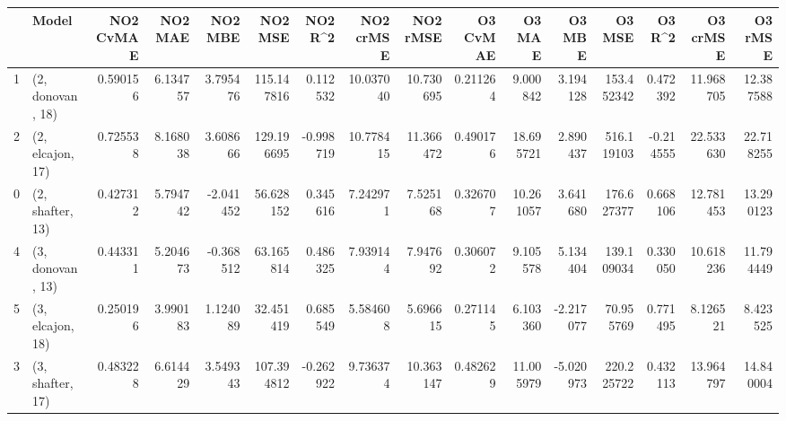 \begin{tabular}{llrrrrrrrrrrrrrr}
\toprule
{} &             Model &  NO2 CvMAE &   NO2 MAE &   NO2 MBE &     NO2 MSE &   NO2 R\textasciicircum2 &  NO2 crMSE &   NO2 rMSE &  O3 CvMAE &     O3 MAE &    O3 MBE &      O3 MSE &    O3 R\textasciicircum2 &   O3 crMSE &    O3 rMSE \\
\midrule
1 &  (2, donovan, 18) &   0.590156 &  6.134757 &  3.795476 &  115.147816 &  0.112532 &  10.037040 &  10.730695 &  0.211264 &   9.000842 &  3.194128 &  153.452342 &  0.472392 &  11.968705 &  12.387588 \\
2 &  (2, elcajon, 17) &   0.725538 &  8.168038 &  3.608666 &  129.196695 & -0.998719 &  10.778415 &  11.366472 &  0.490176 &  18.695721 &  2.890437 &  516.119103 & -0.214555 &  22.533630 &  22.718255 \\
0 &  (2, shafter, 13) &   0.427312 &  5.794742 & -2.041452 &   56.628152 &  0.345616 &   7.242971 &   7.525168 &  0.326707 &  10.261057 &  3.641680 &  176.627377 &  0.668106 &  12.781453 &  13.290123 \\
4 &  (3, donovan, 13) &   0.443311 &  5.204673 & -0.368512 &   63.165814 &  0.486325 &   7.939144 &   7.947692 &  0.306072 &   9.105578 &  5.134404 &  139.109034 &  0.330050 &  10.618236 &  11.794449 \\
5 &  (3, elcajon, 18) &   0.250196 &  3.990183 &  1.124089 &   32.451419 &  0.685549 &   5.584608 &   5.696615 &  0.271145 &   6.103360 & -2.217077 &   70.955769 &  0.771495 &   8.126521 &   8.423525 \\
3 &  (3, shafter, 17) &   0.483228 &  6.614429 &  3.549343 &  107.394812 & -0.262922 &   9.736374 &  10.363147 &  0.482629 &  11.005979 & -5.020973 &  220.225722 &  0.432113 &  13.964797 &  14.840004 \\
\bottomrule
\end{tabular}

